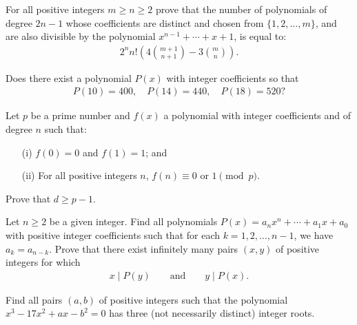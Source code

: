\begin{question}[name={1998 India}]
    For all positive integers $m\geq n \geq 2$ prove that the number of polynomials of degree $2n-1$ whose coefficients are distinct and chosen from $\{1,2,\dots,m\}$, and are also divisible by the polynomial $x^{n-1}+\cdots+x+1$, is equal to:
    \begin{align*}
        2^n n! \left(4\binom{m+1}{n+1}-3\binom{m}{n}\right).
    \end{align*}
\end{question}

\begin{question}[name={1999 Hungary}]
    Does there exist a polynomial $P(x)$ with integer coefficients so that
    \begin{align*}
        P(10)=400, \quad P(14)=440, \quad P(18)=520?
    \end{align*}
\end{question}



\begin{question}[name={1997 IMO Shortlist}]
    Let $p$ be a prime number and $f(x)$ a polynomial with integer coefficients and of degree $n$ such that:
    \begin{itemize}
        \item[(i)] $f(0)=0$ and $f(1)=1$; and
        \item[(ii)] For all positive integers $n$, $f(n) \equiv 0 \text{ or } 1 \pmod p$.
    \end{itemize}
    Prove that $d \geq p-1$.
\end{question}



\begin{question}[name={1997 Romania}]
    Let $n\geq 2$ be a given integer. Find all polynomials $P(x) = a_nx^n+\cdots+a_1x+a_0$ with positive integer coefficients such that for each $k=1,2,\dots,n-1$, we have $a_k=a_{n-k}$. Prove that there exist infinitely many pairs $(x,y)$ of positive integers for which
    \begin{align*}
        x \mid P(y) \qquad \text{and} \qquad y \mid P(x).
    \end{align*}
\end{question}


\begin{question}[name={1998 Austrian--Polish}]
    Find all pairs $(a,b)$ of positive integers such that the polynomial $x^3-17x^2+ax-b^2=0$ has three (not necessarily distinct) integer roots.
\end{question}

